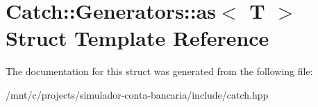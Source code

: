 \hypertarget{structCatch_1_1Generators_1_1as}{}\section{Catch\+:\+:Generators\+:\+:as$<$ T $>$ Struct Template Reference}
\label{structCatch_1_1Generators_1_1as}


The documentation for this struct was generated from the following file\+:\begin{DoxyCompactItemize}
\item 
/mnt/c/projects/simulador-\/conta-\/bancaria/include/catch.\+hpp\end{DoxyCompactItemize}
